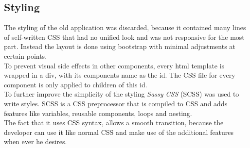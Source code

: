 

\subsection{Styling}
\label{sec:styling}
The styling of the old application was discarded, because it contained many lines of self-written CSS that had no unified look and was not responsive for the most part. Instead the layout is done using bootstrap with minimal adjustments at certain points.\\
To prevent visual side effects in other components, every html template is wrapped in a div, with its components name as the id. The CSS file for every component is only applied to children of this id.\\
To further improve the simplicity of the styling \textit{Sassy CSS} (SCSS) was used to write styles. SCSS is a CSS preprocessor that is compiled to CSS and adds features like variables, reusable components, loops and nesting.\\
The fact that it uses CSS syntax, allows a smooth transition, because the developer can use it like normal CSS and make use of the additional features when ever he desires.
